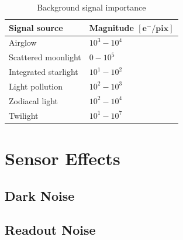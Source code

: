 \begin{table}[] \label{tb:signal_importance}
  \begin{tabular}{|l|l|}
  \hline
  \textbf{Signal source} & \textbf{Magnitude} $\mathbf{\left[ e^- / \textbf{pix}\right]}$ \\ \hline
  Airglow                & $10^3 - 10^4$                              \\ \hline
  Scattered moonlight    & $0 - 10^5$                                 \\ \hline
  Integrated starlight   & $10^1 - 10^2$                              \\ \hline
  Light pollution        & $10^2 - 10^3$                              \\ \hline
  Zodiacal light         & $10^2 - 10^4$                              \\ \hline
  Twilight               & $10^1 - 10^7$                              \\ \hline
  \end{tabular}
  \caption{Background signal importance}
\end{table}

\section{Sensor Effects}

\subsection{Dark Noise}


\subsection{Readout Noise}
